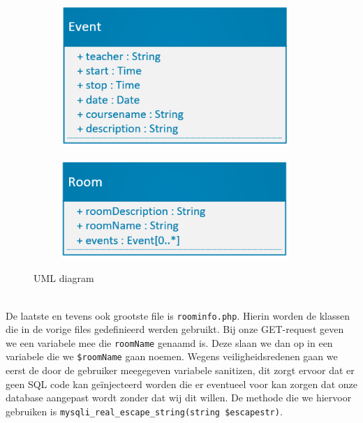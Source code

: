 \documentclass[a4paper,kul]{kulakarticle} %
\begin{document}
\begin{figure}[h]
	\centering
	\begin{subfigure}{0.45\textwidth}
		\centering
		\includegraphics[width=0.95\textwidth]{EventUML.png}
	\end{subfigure}
	\begin{subfigure}{0.45\textwidth}
		\centering
		\includegraphics[width=0.95\textwidth]{RoomUML.png}
	\end{subfigure}
	\caption{UML diagram}
	\label{fig:uml}
\end{figure} \\
De laatste en tevens ook grootste file is \verb|roominfo.php|. Hierin worden de klassen die in de vorige files gedefinieerd werden gebruikt. Bij onze GET-request geven we een variabele mee die \verb|roomName| genaamd is. Deze slaan we dan op in een variabele die we \verb|$roomName| gaan noemen. Wegens veiligheidsredenen gaan we eerst de door de gebruiker meegegeven variabele sanitizen, dit zorgt ervoor dat er geen SQL code kan geïnjecteerd worden die er eventueel voor kan zorgen dat onze database aangepast wordt zonder dat wij dit willen. De methode die we hiervoor gebruiken is \verb|mysqli_real_escape_string(string $escapestr)|.
\end{document}
